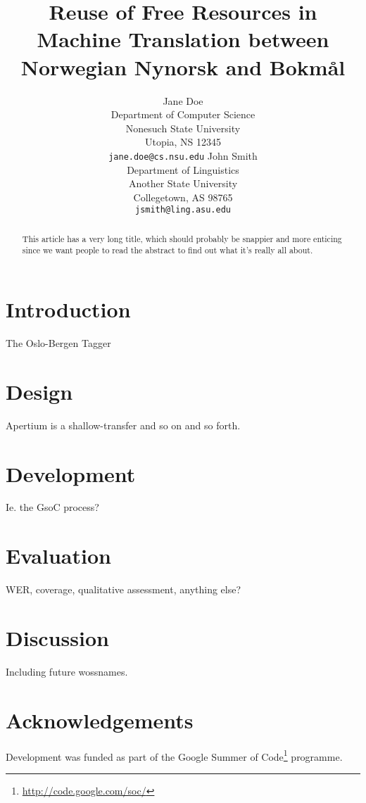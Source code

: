\documentclass[11pt]{article}
\title{Reuse of Free Resources in Machine Translation between Norwegian Nynorsk and Bokmål}
\author{Jane Doe\\
  Department of Computer Science \\
  Nonesuch State University \\
  Utopia, NS 12345 \\
  {\tt jane.doe@cs.nsu.edu} \And
  John Smith \\
  Department of Linguistics \\
  Another State University \\
  Collegetown, AS 98765 \\  
  {\tt jsmith@ling.asu.edu}}
\date{}
\begin{document}
\maketitle

\begin{abstract}
  This article has a very long title, which should probably be snappier and more enticing since we want people to read the abstract to find out what it's really all about.
\end{abstract}

\section{Introduction}
The Oslo-Bergen Tagger \citep{hagen2000cbt}

\section{Design}
Apertium is a shallow-transfer and so on and so forth.

\section{Development}
Ie. the GsoC process? 

\section{Evaluation}
WER, coverage, qualitative assessment, anything else?

\section{Discussion}
Including future wossnames.

\section*{Acknowledgements}

Development was funded as part of the Google Summer of Code\footnote{\url{http://code.google.com/soc/}} programme.



\end{document}
